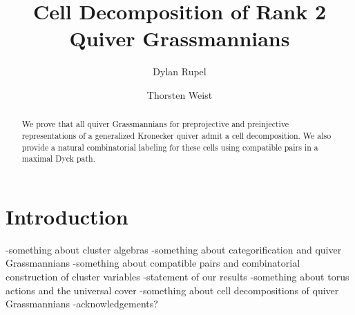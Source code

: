 \documentclass{amsart}
\title{Cell Decomposition of Rank 2 Quiver Grassmannians}
\author{Dylan Rupel}
\author{Thorsten Weist}
\begin{document}
\begin{abstract}
  We prove that all quiver Grassmannians for preprojective and preinjective representations of a generalized Kronecker quiver admit a cell decomposition.  
  We also provide a natural combinatorial labeling for these cells using compatible pairs in a maximal Dyck path. 
\end{abstract}
\maketitle

\section{Introduction}
-something about cluster algebras
-something about categorification and quiver Grassmannians
-something about compatible pairs and combinatorial construction of cluster variables
-statement of our results
-something about torus actions and the universal cover
-something about cell decompositions of quiver Grassmannians
-acknowledgements?


\end{document}
